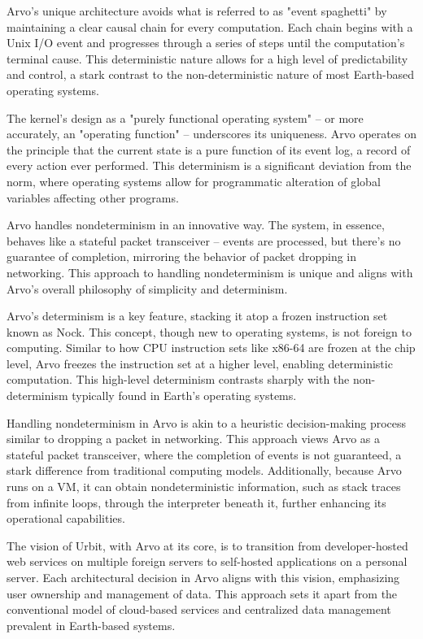 \documentclass[twoside]{article}
\begin{document}
Arvo's unique architecture avoids what is referred to as "event spaghetti" by maintaining a clear causal chain for every computation. Each chain begins with a Unix I/O event and progresses through a series of steps until the computation's terminal cause. This deterministic nature allows for a high level of predictability and control, a stark contrast to the non-deterministic nature of most Earth-based operating systems.

The kernel's design as a "purely functional operating system" – or more accurately, an "operating function" – underscores its uniqueness. Arvo operates on the principle that the current state is a pure function of its event log, a record of every action ever performed. This determinism is a significant deviation from the norm, where operating systems allow for programmatic alteration of global variables affecting other programs.

Arvo handles nondeterminism in an innovative way. The system, in essence, behaves like a stateful packet transceiver – events are processed, but there's no guarantee of completion, mirroring the behavior of packet dropping in networking. This approach to handling nondeterminism is unique and aligns with Arvo's overall philosophy of simplicity and determinism.

Arvo's determinism is a key feature, stacking it atop a frozen instruction set known as Nock. This concept, though new to operating systems, is not foreign to computing. Similar to how CPU instruction sets like x86-64 are frozen at the chip level, Arvo freezes the instruction set at a higher level, enabling deterministic computation. This high-level determinism contrasts sharply with the non-determinism typically found in Earth's operating systems.

Handling nondeterminism in Arvo is akin to a heuristic decision-making process similar to dropping a packet in networking. This approach views Arvo as a stateful packet transceiver, where the completion of events is not guaranteed, a stark difference from traditional computing models. Additionally, because Arvo runs on a VM, it can obtain nondeterministic information, such as stack traces from infinite loops, through the interpreter beneath it, further enhancing its operational capabilities.

The vision of Urbit, with Arvo at its core, is to transition from developer-hosted web services on multiple foreign servers to self-hosted applications on a personal server. Each architectural decision in Arvo aligns with this vision, emphasizing user ownership and management of data. This approach sets it apart from the conventional model of cloud-based services and centralized data management prevalent in Earth-based systems.
\end{document}
